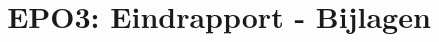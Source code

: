 \documentclass{scrartcl}
\author{}
\title{EPO3: Eindrapport - Bijlagen}
\begin{document}
\renewcommand{\chapternumber}{\appendixname\;\thechapter}
\begin{appendices}

\end{appendices}
\end{document}
